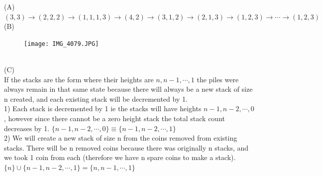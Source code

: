 \documentclass[solution,letterpaper]{cs20}
\begin{document}
\begin{problem}
        \begin{solution}
        (A) \\
        $(3,3) \to (2,2,2) \to (1,1,1,3) \to (4,2) \to (3,1,2) \to (2,1,3) \to (1,2,3) \to \cdots \to (1,2,3)$ \\
        (B) \\
        \begin{figure}[h]
            \centering
            \texttt{[image: IMG\_4079.JPG]}
            \label{fig:enter-label}
        \end{figure} \\
        (C) \\
        If the stacks are the form where their heights are $n, n-1, \cdots, 1$ the piles were always remain in that same state because there will always be a new stack of size n created, and each existing stack will be decremented by 1. \\
        1) Each stack is decremented by 1 ie the stacks will have heights $n-1, n-2, \cdots, 0$, however since there cannot be a zero height stack the total stack count decreases by 1. $\{n-1, n-2, \cdots, 0\} \equiv \{n-1, n-2, \cdots, 1 \}$ \\
        2) We will create a new stack of size n from the coins removed from existing stacks. There will be n removed coins because there was originally n stacks, and we took 1 coin from each (therefore we have n spare coins to make a stack). \\
        $\{n\} \cup \{n-1, n-2, \cdots, 1\} = \{n, n-1, \cdots, 1\}$


        \end{solution}
    \end{problem}
    \newpage
\end{document}
